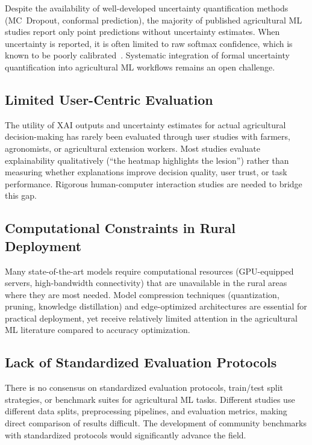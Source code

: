 \documentclass[journal]{IEEEtran}
\begin{document}
Despite the availability of well-developed uncertainty quantification methods (MC~Dropout, conformal prediction), the majority of published agricultural ML studies report only point predictions without uncertainty estimates. When uncertainty is reported, it is often limited to raw softmax confidence, which is known to be poorly calibrated~\cite{guo2017calibration}. Systematic integration of formal uncertainty quantification into agricultural ML workflows remains an open challenge.

\subsection{Limited User-Centric Evaluation}

The utility of XAI outputs and uncertainty estimates for actual agricultural decision-making has rarely been evaluated through user studies with farmers, agronomists, or agricultural extension workers. Most studies evaluate explainability qualitatively (``the heatmap highlights the lesion'') rather than measuring whether explanations improve decision quality, user trust, or task performance. Rigorous human-computer interaction studies are needed to bridge this gap.

\subsection{Computational Constraints in Rural Deployment}

Many state-of-the-art models require computational resources (GPU-equipped servers, high-bandwidth connectivity) that are unavailable in the rural areas where they are most needed. Model compression techniques (quantization, pruning, knowledge distillation) and edge-optimized architectures are essential for practical deployment, yet receive relatively limited attention in the agricultural ML literature compared to accuracy optimization.

\subsection{Lack of Standardized Evaluation Protocols}

There is no consensus on standardized evaluation protocols, train/test split strategies, or benchmark suites for agricultural ML tasks. Different studies use different data splits, preprocessing pipelines, and evaluation metrics, making direct comparison of results difficult. The development of community benchmarks with standardized protocols would significantly advance the field.
\end{document}
